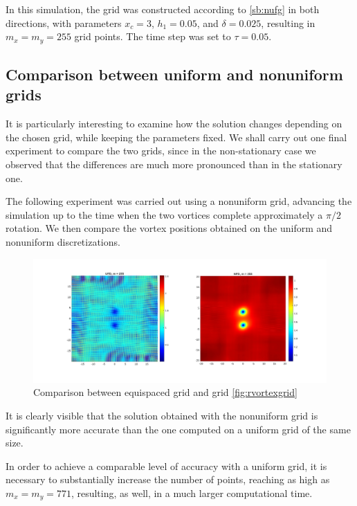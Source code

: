 In this simulation, the grid was constructed according to \ref{sb:nufg} in both directions, with parameters $x_c = 3$, $h_1 = 0.05$, and $\delta = 0.025$, resulting in $m_x = m_y = 255$ grid points. The time step was set to $\tau = 0.05$.

\subsection{Comparison between uniform and nonuniform grids}

It is particularly interesting to examine how the solution changes depending on the chosen grid, while keeping the parameters fixed. We shall carry out one final experiment to compare the two grids, since in the non-stationary case we observed that the differences are much more pronounced than in the stationary one.

The following experiment was carried out using a nonuniform grid, advancing the simulation up to the time when the two vortices complete approximately a $\pi/2$ rotation. We then compare the vortex positions obtained on the uniform and nonuniform discretizations.

\begin{figure}[H]
    \centering
    \includegraphics[width=\textwidth]{img/comp_unfd.pdf}
    \caption{Comparison between equispaced grid and grid \ref{fig:rvortexgrid}}
\end{figure}

It is clearly visible that the solution obtained with the nonuniform grid is significantly more accurate than the one computed on a uniform grid of the same size.

In order to achieve a comparable level of accuracy with a uniform grid, it is necessary to substantially increase the number of points, reaching as high as $m_x = m_y = 771$, resulting, as well, in a much larger computational time.

